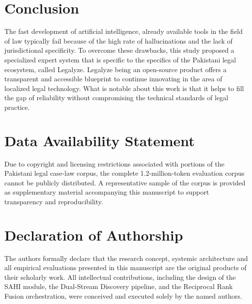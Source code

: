 \section{Conclusion}
\label{sec:conclusion}

\hspace*{2em}The fast development of artificial intelligence, already available tools
in the field of law typically fail because of the high rate of hallucinations and the
lack of jurisdictional specificity. To overcome these drawbacks, this study proposed a
specialized expert system that is specific to the specifics of the Pakistani legal
ecosystem, called Legalyze.  Legalyze
being an open-source product offers a transparent and accessible blueprint to continue
innovating in the area of localized legal technology. What is notable about this work
is that it helps to fill the gap of reliability without compromising the technical
standards of legal practice. 

\section*{Data Availability Statement}

\hspace*{2em}Due to copyright and licensing restrictions associated with portions of the Pakistani legal case-law corpus, the complete 1.2-million-token evaluation corpus cannot be publicly distributed. A representative sample of the corpus is provided as supplementary material accompanying this manuscript to support transparency and reproducibility.

\section*{Declaration of Authorship}
\hspace*{2em} The authors formally declare that the research concept, systemic architecture and all empirical evaluations presented in this manuscript are the original products of their scholarly work. All intellectual contributions, including the design of the SAHI module, the Dual-Stream Discovery pipeline, and the Reciprocal Rank Fusion orchestration, were conceived and executed solely by the named authors.

